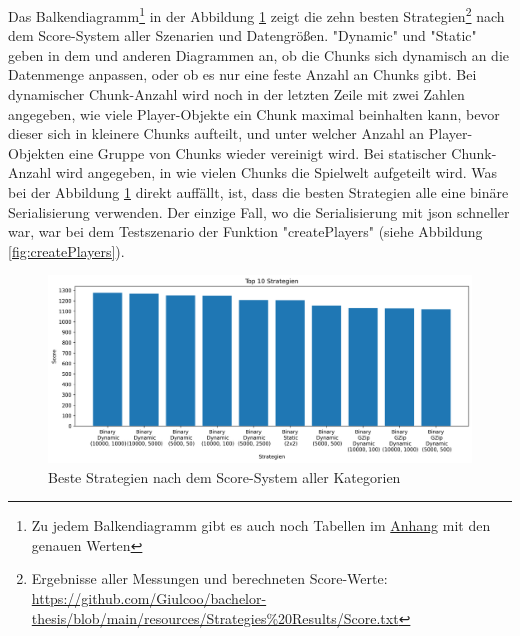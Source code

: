 Das Balkendiagramm\footnote{Zu jedem Balkendiagramm gibt es auch noch Tabellen im \hyperref[ch:appendix]{Anhang} mit den genauen Werten} in der Abbildung \ref{fig:topStrat} zeigt die zehn besten Strategien\footnote{\label{stratScores}Ergebnisse aller Messungen und berechneten Score-Werte: \url{https://github.com/Giulcoo/bachelor-thesis/blob/main/resources/Strategies\%20Results/Score.txt}} nach dem Score-System aller Szenarien und Datengrößen. "Dynamic" und "Static" geben in dem und anderen Diagrammen an, ob die Chunks sich dynamisch an die Datenmenge anpassen, oder ob es nur eine feste Anzahl an Chunks gibt. Bei dynamischer Chunk-Anzahl wird noch in der letzten Zeile mit zwei Zahlen angegeben, wie viele Player-Objekte ein Chunk maximal beinhalten kann, bevor dieser sich in kleinere Chunks aufteilt, und unter welcher Anzahl an Player-Objekten eine Gruppe von Chunks wieder vereinigt wird. Bei statischer Chunk-Anzahl wird angegeben, in wie vielen Chunks die Spielwelt aufgeteilt wird. Was bei der Abbildung \ref{fig:topStrat} direkt auffällt, ist, dass die besten Strategien alle eine binäre Serialisierung verwenden. Der einzige Fall, wo die Serialisierung mit \ac{json} schneller war, war bei dem Testszenario der Funktion "createPlayers" (siehe Abbildung \ref{fig:createPlayers}).

\begin{figure}[htp]
    \centering
    \includegraphics[width=1\textwidth]{images/plots/top.png}
    \caption{Beste Strategien nach dem Score-System aller Kategorien}
    \label{fig:topStrat}
\end{figure}

